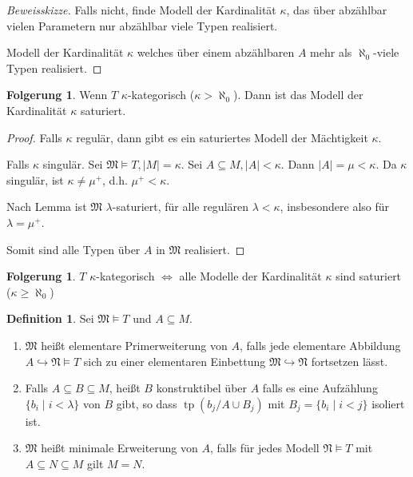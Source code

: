 \documentclass[12pt,parskip=full]{scrartcl}
\newcommand{\abs}[1]{{\left| #1 \right|}}
\theoremstyle{definition}
\newtheorem{corollary}[theorem]{Folgerung}
\newtheorem{definition}[theorem]{Definition}
\begin{document}
 	\begin{proof}[Beweisskizze]
 		Falls nicht, finde Modell der Kardinalität $\kappa$, das über abzählbar vielen Parametern nur abzählbar viele Typen realisiert.
 		
 		Modell der Kardinalität $\kappa$ welches über einem abzählbaren $A$ mehr als $\aleph_0$-viele Typen realisiert.
 	\end{proof}
 
 	\begin{corollary}
 		Wenn $T$ $\kappa$-kategorisch ($\kappa > \aleph_0$). Dann ist das Modell der Kardinalität $\kappa$ saturiert.
 	\end{corollary}
 
 	\begin{proof}
 		Falls $\kappa$ regulär, dann gibt es ein saturiertes Modell der Mächtigkeit $\kappa$.
 		
 		Falls $\kappa$ singulär. Sei $\mathfrak{M} \models T, \abs{M} = \kappa$. Sei $A \subseteq M, \abs{A} < \kappa$. Dann $\abs{A} = \mu < \kappa$. Da $\kappa$ singulär, ist $\kappa \neq \mu^+$, d.h. $\mu^+ < \kappa$.
 		
 		Nach Lemma ist $\mathfrak{M}$ $\lambda$-saturiert, für alle regulären $\lambda < \kappa$, insbesondere also für $\lambda = \mu^+$.
 		
 		Somit sind alle Typen über $A$ in $\mathfrak{M}$ realisiert.
 	\end{proof}
 
 	\begin{corollary}
 		$T$ $\kappa$-kategorisch $\Leftrightarrow$ alle Modelle der Kardinalität $\kappa$ sind saturiert ($\kappa \geq \aleph_0$)
 	\end{corollary}
 
 	\begin{definition}
 		Sei $\mathfrak{M} \models T$ und $A \subseteq M$.
 		\begin{enumerate}
 			\item $\mathfrak{M}$ heißt elementare Primerweiterung von $A$, falls jede elementare Abbildung $A \hookrightarrow \mathfrak{N} \models T$ sich zu einer elementaren Einbettung $\mathfrak{M} \hookrightarrow \mathfrak{N}$ fortsetzen lässt.
 			\item Falls $A \subseteq B \subseteq M$, heißt $B$ konstruktibel über $A$ falls es eine Aufzählung $\{ b_i \mid i < \lambda \}$ von $B$ gibt, so dass $\operatorname{tp}(b_{j}/A \cup B_j)$ mit $B_j = \{ b_i \mid i < j \}$ isoliert ist.
 			\item $\mathfrak{M}$ heißt minimale Erweiterung von $A$, falls für jedes Modell $\mathfrak{N} \models T$ mit $A \subseteq N \subseteq M$ gilt $M = N$.
 		\end{enumerate}
 	\end{definition}
 
\end{document}
